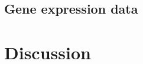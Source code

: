 \documentclass{article} %
\begin{document}
%
%
%
%
%

\subsection{Gene expression data}

\section{Discussion}

\begin{small}

%
%

\end{small}

%
\end{document}
